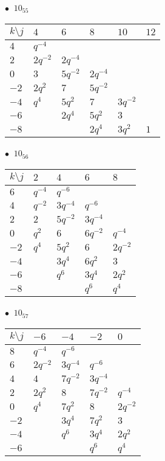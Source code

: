 %
\begin{minipage}{\linewidth}
$\bullet\ $ $10_{55}$ \vspace{0.5em} \\
\begin{tabular}{l|lllll}
$k \setminus j$ & $4$ & $6$ & $8$ & $10$ & $12$ \\
\hline
$4$ & $q^{-4}$ &  &  &  &  \\
$2$ & $2q^{-2}$ & $2q^{-4}$ &  &  &  \\
$0$ & $3$ & $5q^{-2}$ & $2q^{-4}$ &  &  \\
$-2$ & $2q^{2}$ & $7$ & $5q^{-2}$ &  &  \\
$-4$ & $q^{4}$ & $5q^{2}$ & $7$ & $3q^{-2}$ &  \\
$-6$ &  & $2q^{4}$ & $5q^{2}$ & $3$ &  \\
$-8$ &  &  & $2q^{4}$ & $3q^{2}$ & $1$ \\
\end{tabular}
\vspace{2em}
\end{minipage}
%
\begin{minipage}{\linewidth}
$\bullet\ $ $10_{56}$ \vspace{0.5em} \\
\begin{tabular}{l|llll}
$k \setminus j$ & $2$ & $4$ & $6$ & $8$ \\
\hline
$6$ & $q^{-4}$ & $q^{-6}$ &  &  \\
$4$ & $q^{-2}$ & $3q^{-4}$ & $q^{-6}$ &  \\
$2$ & $2$ & $5q^{-2}$ & $3q^{-4}$ &  \\
$0$ & $q^{2}$ & $6$ & $6q^{-2}$ & $q^{-4}$ \\
$-2$ & $q^{4}$ & $5q^{2}$ & $6$ & $2q^{-2}$ \\
$-4$ &  & $3q^{4}$ & $6q^{2}$ & $3$ \\
$-6$ &  & $q^{6}$ & $3q^{4}$ & $2q^{2}$ \\
$-8$ &  &  & $q^{6}$ & $q^{4}$ \\
\end{tabular}
\vspace{2em}
\end{minipage}
%
\begin{minipage}{\linewidth}
$\bullet\ $ $10_{57}$ \vspace{0.5em} \\
\begin{tabular}{l|llll}
$k \setminus j$ & $-6$ & $-4$ & $-2$ & $0$ \\
\hline
$8$ & $q^{-4}$ & $q^{-6}$ &  &  \\
$6$ & $2q^{-2}$ & $3q^{-4}$ & $q^{-6}$ &  \\
$4$ & $4$ & $7q^{-2}$ & $3q^{-4}$ &  \\
$2$ & $2q^{2}$ & $8$ & $7q^{-2}$ & $q^{-4}$ \\
$0$ & $q^{4}$ & $7q^{2}$ & $8$ & $2q^{-2}$ \\
$-2$ &  & $3q^{4}$ & $7q^{2}$ & $3$ \\
$-4$ &  & $q^{6}$ & $3q^{4}$ & $2q^{2}$ \\
$-6$ &  &  & $q^{6}$ & $q^{4}$ \\
\end{tabular}
\vspace{2em}
\end{minipage}
